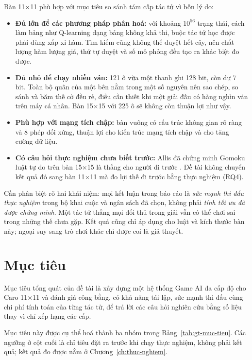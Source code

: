 Bàn 11×11 phù hợp với mục tiêu so sánh tám cấp tác tử vì bốn lý do:
\begin{itemize}
  \item \textbf{Đủ lớn để các phương pháp phân hoá:} với khoảng $10^{56}$ trạng thái, cách làm bảng như Q-learning dạng bảng không khả thi, buộc tác tử học được phải dùng xấp xỉ hàm. Tìm kiếm cũng không thể duyệt hết cây, nên chất lượng hàm lượng giá, thứ tự duyệt và số mô phỏng đều tạo ra khác biệt đo được.
  \item \textbf{Đủ nhỏ để chạy nhiều ván:} 121 ô vừa một thanh ghi 128 bit, còn dư 7 bit. Toàn bộ quân của một bên nằm trong một số nguyên nên sao chép, so sánh và băm thế cờ đều rẻ, điều cần thiết khi một giải đấu có hàng nghìn ván trên máy cá nhân. Bàn 15×15 với 225 ô sẽ không còn thuận lợi như vậy.
  \item \textbf{Phù hợp với mạng tích chập:} bàn vuông có cấu trúc không gian rõ ràng và 8 phép đối xứng, thuận lợi cho kiến trúc mạng tích chập và cho tăng cường dữ liệu.
  \item \textbf{Có câu hỏi thực nghiệm chưa biết trước:} Allis đã chứng minh Gomoku luật tự do trên bàn 15×15 là thắng cho người đi trước \cite{allis1994}. Đề tài không chuyển kết quả đó sang bàn 11×11 mà đo lợi thế đi trước bằng thực nghiệm (RQ4).
\end{itemize}

Cần phân biệt rõ hai khái niệm: mọi kết luận trong báo cáo là \emph{sức mạnh thi đấu thực nghiệm} trong bộ khai cuộc và ngân sách đã chọn, không phải \emph{tính tối ưu đã được chứng minh}. Một tác tử thắng mọi đối thủ trong giải vẫn có thể chơi sai trong những thế chưa gặp. Kết quả cũng chỉ áp dụng cho luật và kích thước bàn này; ngoại suy sang trò chơi khác chỉ được coi là giả thuyết.

\section{Mục tiêu}
\label{sec:gt-muc-tieu}
Mục tiêu tổng quát của đề tài là xây dựng một hệ thống Game AI đa cấp độ cho Caro 11×11 và đánh giá công bằng, có khả năng tái lập, sức mạnh thi đấu cùng chi phí tính toán của từng tác tử, để trả lời các câu hỏi nghiên cứu bằng số liệu thay vì chỉ xếp hạng các cấp.

Mục tiêu này được cụ thể hoá thành ba nhóm trong Bảng~\ref{tab:gt-muc-tieu}. Các ngưỡng ở cột cuối là chỉ tiêu đặt ra trước khi chạy thực nghiệm, không phải kết quả; kết quả đo được nằm ở Chương~\ref{ch:thuc-nghiem}.

